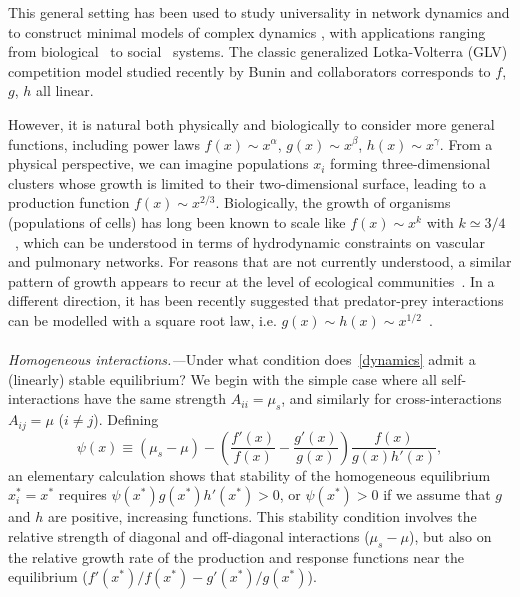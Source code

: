 \documentclass[
 prl,
 twocolumn,
 amsmath,
 amssymb,
 aps,
]{revtex4-2}
\begin{document}
This general setting has been used to study universality in network dynamics \cite{Barzel2013} and to construct minimal models of complex dynamics \cite{Barzel2015}, with applications ranging from biological~\cite{Alon2006,Karlebach2008} 
to social~\cite{Pastor-Satorras2001,Hufnagel2004,Dodds2005} systems.
The classic generalized Lotka-Volterra (GLV) competition model studied recently by Bunin and collaborators \cite{bunin2017ecological, biroli2018marginally} corresponds to $f$, $g$, $h$ all linear. 

However, it is natural both physically and biologically to consider more general functions, including power laws $f(x)\sim x^\alpha$, $g(x)\sim x^\beta$, $h(x) \sim x^\gamma$.
From a physical perspective, we can imagine populations $x_i$ forming three-dimensional clusters whose growth is limited to their two-dimensional surface, leading to a production function $f(x) \sim x^{2/3}$.
Biologically, the growth of organisms (populations of cells) has long been known to scale like $f(x) \sim x^k$ with $k\simeq 3/4$~\cite{Brown2004}, which can be understood in terms of hydrodynamic constraints on vascular and pulmonary networks.
For reasons that are not currently understood, a similar pattern of growth appears to recur at the level of ecological communities~\cite{Hatton2015,Hatton2024}.
In a different direction, it has been recently suggested that predator-prey interactions can be modelled with a square root law, i.e. $g(x) \sim h(x) \sim x^{1/2}$~\cite{Barbier2021,Mazzarisi2023}.

\paragraph*{}
\emph{Homogeneous interactions.---}Under what condition does~\eqref{dynamics} admit a (linearly) stable equilibrium? 
We begin with the simple case where all self-interactions have the same strength $A_{ii} = \mu_s$, and similarly for cross-interactions $A_{ij} = \mu$ ($i\neq j$).
Defining 
\begin{equation}
    \psi(x) \equiv (\mu_s - \mu) -  \left(\frac{f'(x)}{f(x)} - \frac{g'(x)}{g(x)}\right)\frac{f(x)}{g(x)h'(x)},
    \label{eq: psi}
\end{equation}
an elementary calculation shows that stability of the homogeneous equilibrium $x_i^* = x^*$ requires $\psi(x^*)g(x^*)h'(x^*) > 0$, or $\psi(x^*)>0$ if we assume that $g$ and $h$ are positive, increasing functions. This stability condition involves the relative strength of diagonal and off-diagonal interactions ($\mu_s - \mu$), but also on the relative growth rate of the production and response functions near the equilibrium ($f'(x^*)/f(x^*) - g'(x^*)/g(x^*)$).
\end{document}
